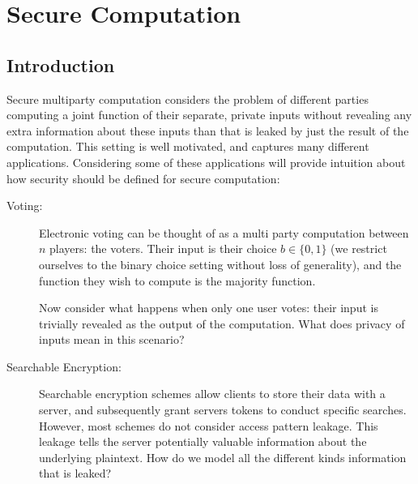 \newcommand{\PartyA}{P_1}
\newcommand{\PartyB}{P_2}
\newcommand{\InputA}{x_1}
\newcommand{\InputB}{x_2}


\newcommand{\Garble}{\mathsf{Garble}}
\newcommand{\Eval}{\mathsf{Eval}}
\newcommand{\Cir}{C}
\newcommand{\GCir}{\widetilde{C}}
\newcommand{\Lab}{\mathsf{lab}}

\newcommand{\Sim}{\mathsf{Sim}}

\newcommand{\NOT}{\mathsf{NOT}}
\newcommand{\AND}{\mathsf{AND}}
\newcommand{\XOR}{\mathsf{XOR}}

\newcommand{\out}{\mathsf{out}}
\newcommand{\Assign}{:=}


\chapter{Secure Computation}
\section{Introduction}
Secure multiparty computation considers the problem of different parties
computing a joint function of their separate, private inputs without revealing
any extra information about these inputs than that is leaked by just the result
of the computation. This setting is well motivated, and captures many different
applications. Considering some of these applications will provide intuition
about how security should be defined for secure computation:
\begin{description}
  \item[Voting:] Electronic voting can be thought of as a multi party computation
	  between $n$ players: the voters. Their input is their choice $b \in \{0,1\}$
    (we restrict ourselves to the binary choice setting without loss of generality), and the function
    they wish to compute is the majority function.

    Now consider what happens when only one user votes: their input is trivially
    revealed as the output of the computation. What does privacy of inputs mean
    in this scenario?

  \item[Searchable Encryption:] Searchable encryption schemes allow clients
    to store their data with a server, and subsequently grant servers tokens
    to conduct specific searches. However, most schemes do not consider access
    pattern leakage. This leakage tells the server potentially valuable information
    about the underlying plaintext. How do we model all the different kinds
    information that is leaked?
\end{description}


